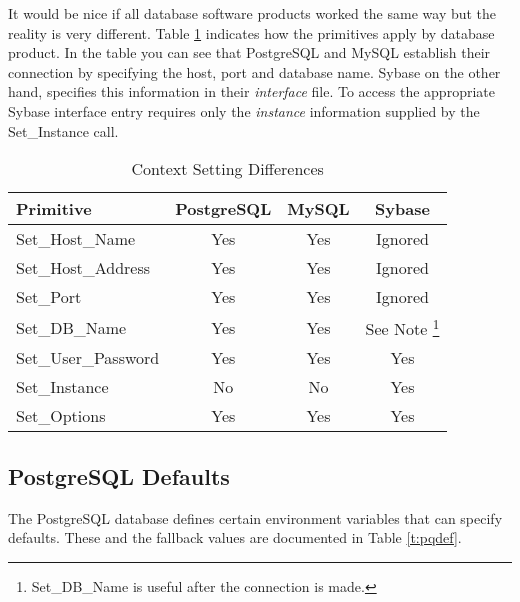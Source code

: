 \documentclass[english,letterpaper]{book}
\begin{document}
It would be nice if all database software products worked the same
way but the reality is very different. Table \ref{t:ctxdiffs} indicates how
the primitives apply by database product.\label{Set_Instance Support Chart}
In the table you can see that PostgreSQL and MySQL establish their
connection by specifying the host, port and database name. Sybase
on the other hand, specifies this information in their \emph{interface}
file. To access the appropriate Sybase interface entry requires only
the \emph{instance} information supplied by the Set\_Instance call.

\begin{table}
   \begin{center}
      \begin{tabular}{lccc}
      Primitive            & PostgreSQL   & MySQL  & Sybase \\
      \hline 
      Set\_Host\_Name      & Yes          & Yes    & Ignored \\
      Set\_Host\_Address   & Yes          & Yes    & Ignored \\
      Set\_Port            & Yes          & Yes    & Ignored \\
      Set\_DB\_Name        & Yes          & Yes    & See Note %
      \footnote{Set\_DB\_Name is useful after the connection is made.}\\
      Set\_User\_Password  & Yes          & Yes    & Yes \\
      Set\_Instance        & No           & No     & Yes \\
      Set\_Options         & Yes          & Yes    & Yes \\
      \end{tabular}
   \end{center}
\caption{Context Setting Differences}\label{t:ctxdiffs}
\end{table}

\subsection{PostgreSQL Defaults}

The PostgreSQL database defines certain environment variables that
can specify defaults. These and the fallback values are documented
in Table \ref{t:pqdef}.
\end{document}
